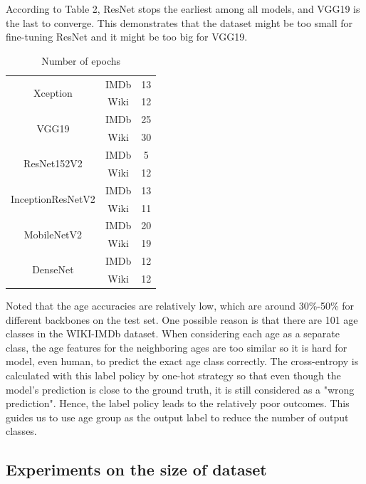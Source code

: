 \documentclass[DIV=calc, paper=a4, fontsize=10pt, twocolumn]{article}
\begin{document}
	According to Table 2, ResNet stops the earliest among all models, and VGG19 is the last to converge. This demonstrates that the dataset might be too small for fine-tuning ResNet and it might be too big for VGG19.
	
	\begin{table}[H]
		\centering
		\begin{tabular}{|c|c|c|}
			\hline
			\multirow{2}{*}{Xception}          & IMDb & 13 \\ \cline{2-3} 
			& Wiki & 12 \\ \hline
			\multirow{2}{*}{VGG19}             & IMDb & 25 \\ \cline{2-3} 
			& Wiki & 30 \\ \hline
			\multirow{2}{*}{ResNet152V2}       & IMDb & 5  \\ \cline{2-3} 
			& Wiki & 12 \\ \hline
			\multirow{2}{*}{InceptionResNetV2} & IMDb & 13 \\ \cline{2-3} 
			& Wiki & 11 \\ \hline
			\multirow{2}{*}{MobileNetV2}       & IMDb & 20 \\ \cline{2-3} 
			& Wiki & 19 \\ \hline
			\multirow{2}{*}{DenseNet}          & IMDb & 12 \\ \cline{2-3} 
			& Wiki & 12 \\ \hline
		\end{tabular}
		\caption{Number of epochs}
		\label{table:epochs}
	\end{table}
	
	
	Noted that the age accuracies are relatively low, which are around 30\%-50\% for different backbones on the test set. One possible reason is that there are 101 age classes in the WIKI-IMDb dataset. When considering each age as a separate class, the age features for the neighboring ages are too similar so it is hard for model, even human, to predict the exact age class correctly. The cross-entropy is calculated with this label policy by one-hot strategy so that even though the model's prediction is close to the ground truth, it is still considered as a "wrong prediction". Hence, the label policy leads to the relatively poor outcomes. This guides us to use age group as the output label to reduce the number of output classes.
	
	\subsection{Experiments on the size of dataset}
	
\end{document}
